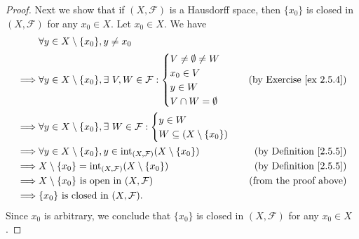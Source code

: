 \begin{proof}
    Next we show that if \((X, \mathcal{F})\) is a Hausdorff space, then \(\{x_0\}\) is closed in \((X, \mathcal{F})\) for any \(x_0 \in X\).
    Let \(x_0 \in X\).
    We have
    \begin{align*}
                 & \forall y \in X \setminus \{x_0\}, y \neq x_0                                                                                    \\
        \implies & \forall y \in X \setminus \{x_0\}, \exists\ V, W \in \mathcal{F} : \begin{cases}
                                                                                          V \neq \emptyset \neq W \\
                                                                                          x_0 \in V               \\
                                                                                          y \in W                 \\
                                                                                          V \cap W = \emptyset
                                                                                      \end{cases}            & \text{(by Exercise \ref{ex 2.5.4})}  \\
        \implies & \forall y \in X \setminus \{x_0\}, \exists\ W \in \mathcal{F} : \begin{cases}
                                                                                       y \in W \\
                                                                                       W \subseteq (X \setminus \{x_0\})
                                                                                   \end{cases}                                 \\
        \implies & \forall y \in X \setminus \{x_0\}, y \in \text{int}_{(X, \mathcal{F})}(X \setminus \{x_0\}) & \text{(by Definition \ref{2.5.5})} \\
        \implies & X \setminus \{x_0\} = \text{int}_{(X, \mathcal{F})}(X \setminus \{x_0\})                    & \text{(by Definition \ref{2.5.5})} \\
        \implies & X \setminus \{x_0\} \text{ is open in } (X, \mathcal{F})                                    & \text{(from the proof above)}      \\
        \implies & \{x_0\} \text{ is closed in } (X, \mathcal{F}).
    \end{align*}
    Since \(x_0\) is arbitrary, we conclude that \(\{x_0\}\) is closed in \((X, \mathcal{F})\) for any \(x_0 \in X\).


\end{proof}
